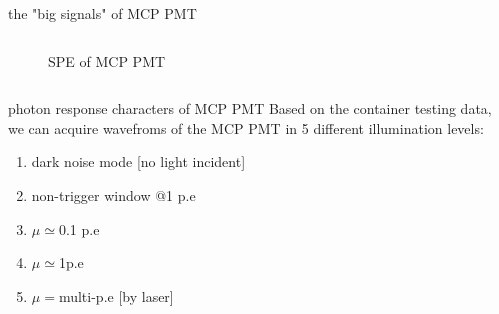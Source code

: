 \documentclass[11pt,compress,xcolor=x11names,UTF8]{beamer}
\begin{document}
\begin{frame}{the "big signals" of MCP PMT}
\begin{columns}
\begin{column}{.485\textwidth}
\begin{figure}
\caption{SPE of MCP PMT}
\end{figure}
\end{column}
\end{columns}
\end{frame}
\begin{frame}{photon response characters of MCP PMT }
Based on the container testing data, we can acquire wavefroms of  the MCP PMT in 5 different illumination levels:
	\begin{enumerate}
	\item dark noise mode [no light incident]
	\item non-trigger window @1 p.e
	\item $\mu\simeq$0.1 p.e
	\item $\mu\simeq$1p.e
	\item $\mu=$multi-p.e [by laser]
	\end{enumerate}
\end{frame}
\end{document}
